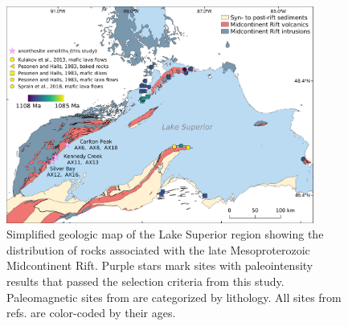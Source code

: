 \begin{figure}[h!]
\centering
\noindent\includegraphics[width=0.9\textwidth]{figure/Zhang2022/Geologic_map.pdf}
\caption{\footnotesize{Simplified geologic map of the Lake Superior region showing the distribution of rocks associated with the late Mesoproterozoic Midcontinent Rift. Purple stars mark sites with paleointensity results that passed the selection criteria from this study. Paleomagnetic sites from \citealp{Pesonen1983a} are categorized by lithology. All sites from refs. \citealp{Pesonen1983a, Kulakov2013a, Sprain2018a} are color-coded by their ages.}}
\label{fig:Chap_PINT_Geologic_map}
\end{figure}

